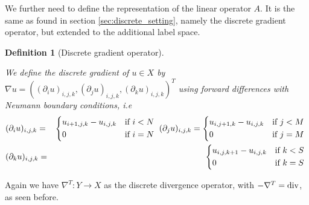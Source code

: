 \documentclass{scrreprt}
\newtheorem{definition}[theorem]{Definition}
\begin{document}
        We further need to define the representation of the linear operator $A$. It is the same as found in section \ref{sec:discrete_setting}, namely the discrete gradient operator, but extended to the additional label space.

        \begin{definition}[Discrete gradient operator] %
        \label{def:discrete_gradient_operator_ms}

            We define the discrete gradient of $u \in X$ by $\nabla u = ((\partial_{i}u)_{i,j,k}, (\partial_{j}u)_{i,j,k}, (\partial_{k}u)_{i,j,k})^{T}$ using forward differences with Neumann boundary conditions, i.e
                \begin{eqnarray}
                    &(\partial_{i}u)_{i,j,k} =&
                        \begin{dcases*}
                            u_{i+1, j, k} - u_{i, j, k} & \textnormal{if $i < N$} \\
                            0 & \textnormal{if $i = N$}
                        \end{dcases*}
                    \notag
                    (\partial_{j}u)_{i, j, k} =
                        \begin{dcases*}
                            u_{i, j+1, k} - u_{i, j, k} & \textnormal{if $j < M$} \\
                            0 & \textnormal{if $j = M$}
                        \end{dcases*}
                    \notag \\
                    &(\partial_{k}u)_{i, j, k} =&
                        \begin{dcases*}
                            u_{i, j, k+1} - u_{i, j, k} & \textnormal{if $k < S$} \\
                            0 & \textnormal{if $k = S$}
                        \end{dcases*}
                    \notag
                \end{eqnarray}

        \end{definition}

        Again we have $\nabla^{T}: Y \longrightarrow X$ as the discrete divergence operator, with $-\nabla^{T} = \textnormal{div}$, as seen before.
\end{document}
